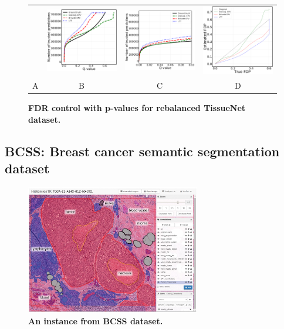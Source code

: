 \documentclass{article}
\begin{document}
\begin{figure}
	\centering
	\begin{tabular}{cccc}
 		&
		\includegraphics[width=1.7in]{img/cnn_cells_balanced_TA_fdr_control.png} & 
            \includegraphics[width=1.7in]{img/cnn_cells_balanced_TA_fdr_control_loc.png} & 
            \includegraphics[width=1.7in]{img/cnn_FDPscat_cells_balanced_TA.png}
		\\	
		A & B & C & D
	\end{tabular}
	\caption{\bf FDR control with p-values for rebalanced TissueNet dataset.}
	\label{fig:tissue_rebalance}
\end{figure}


\subsection{BCSS: Breast cancer semantic segmentation dataset}

\begin{figure}
	\advance\leftskip-0.5cm
	\includegraphics[width=3in]{img/bcss_instance.jpeg}
	\caption{{\bf An instance from BCSS dataset.}}
	\label{fig:bcss_example}
\end{figure} 
\end{document}
